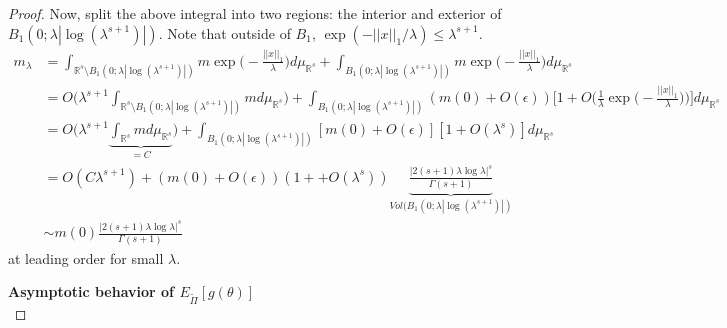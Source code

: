 \documentclass[10pt,fleqn]{article}
\DeclareMathOperator{\1}{\mathbbm{1}}
\begin{document}
{\begin{proof}
Now, split the above integral into two regions: the interior and exterior of $B_1(0;\lambda|\log(\lambda^{s+1})|)$. Note that outside of $B_1$, $\exp(-||x||_1/\lambda) \le \lambda^{s+1}.$
\begin{align*}
m_\lambda &= \int_{\mathbb{R}^s \setminus B_1(0;\lambda|\log(\lambda^{s+1})|)}m \exp\bigg(-\frac{||x||_1}{\lambda}\bigg)d\mu_{\mathbb{R}^s} + \int_{B_1(0;\lambda|\log(\lambda^{s+1})|)}m \exp\bigg(-\frac{||x||_1}{\lambda}\bigg)d\mu_{\mathbb{R}^s} \\
&=O\bigg( \lambda^{s+1} \int_{\mathbb{R}^s \setminus B_1(0;\lambda|\log(\lambda^{s+1})|)}m d\mu_{\mathbb{R}^s}\bigg) + \int_{B_1(0;\lambda|\log(\lambda^{s+1})|)} (m(0)+O(\epsilon)) \bigg[1+O\bigg(\frac{1}{\lambda}\exp\bigg(-\frac{||x||_1}{\lambda}\bigg)\bigg)\bigg]d\mu_{\mathbb{R}^s}\\
&= O\bigg( \lambda^{s+1} \underbrace{\int_{\mathbb{R}^s}m d\mu_{\mathbb{R}^s}}_{=C}\bigg) + \int_{B_1(0;\lambda|\log(\lambda^{s+1})|)} [m(0) + O(\epsilon)][1+O(\lambda^s)] d\mu_{\mathbb{R}^s}  \\
&= O(C \lambda^{s+1}) + (m(0)+O(\epsilon))(1++ O(\lambda^s)) \underbrace{\frac{|2(s+1)\lambda \log \lambda |^s}{\Gamma(s+1)}}_{Vol(B_1(0;\lambda|\log(\lambda^{s+1})|)}   \\
&\sim m(0) \frac{|2(s+1)\lambda \log \lambda |^s}{\Gamma(s+1)}
\end{align*}
at leading order for small $\lambda$.

\vspace{1cm}
\noindent \textbf{Asymptotic behavior of $E_{\tilde{\Pi}}[g(\theta)]$} \\


\end{proof}}
\end{document}
